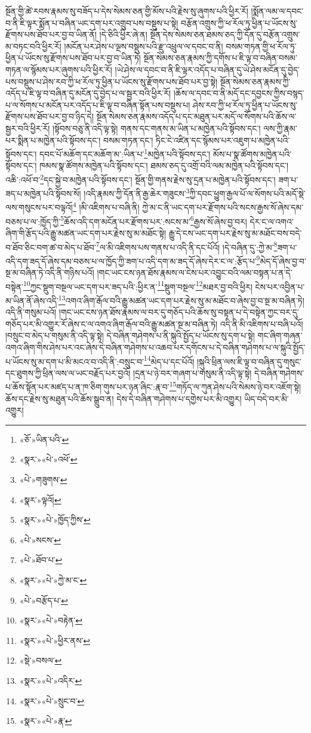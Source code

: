 སྔོན་གྱི་ཚེ་རབས་རྣམས་སུ་བཟོད་པ་དེས་སེམས་ཅན་གྱི་མོས་པའི་རྗེས་སུ་ཞུགས་པའི་ཕྱིར་རོ། །སྨོན་ལམ་ལ་དབང་བ་ནི་ཇི་ལྟར་སྨོན་པ་བཞིན་ཡང་དག་པར་འགྲུབ་པས་བསྡུས་པ་སྟེ། བརྩོན་འགྲུས་ཀྱི་ཕ་རོལ་ཏུ་ཕྱིན་པ་ཡོངས་སུ་རྫོགས་པས་ཐོབ་པར་བྱ་བ་ཡིན་ནོ། །དེ་ཅིའི་ཕྱིར་ཞེ་ན། སྔོན་དེས་སེམས་ཅན་ཐམས་ཅད་ཀྱི་དོན་དུ་བརྩོན་འགྲུས་མ་བཏང་བའི་ཕྱིར་རོ། །མངོན་པར་ཤེས་པ་ལྔས་བསྡུས་པའི་རྫུ་འཕྲུལ་ལ་དབང་བ་ནི། བསམ་གཏན་གྱི་ཕ་རོལ་ཏུ་ཕྱིན་པ་ཡོངས་སུ་རྫོགས་པས་ཐོབ་པར་བྱ་བ་ཡིན་ཏེ། སྔོན་སེམས་ཅན་རྣམས་ཀྱི་དགོས་པ་ཇི་ལྟ་བ་བཞིན་བསམ་གཏན་ལ་སྙོམས་པར་ཞུགས་པའི་ཕྱིར་རོ། །ཡེ་ཤེས་ལ་དབང་བ་ནི་ཇི་ལྟར་འདོད་པ་བཞིན་དུ་ཡེ་ཤེས་མངོན་དུ་བྱེད་པས་བསྡུས་པ་ཤེས་རབ་ཀྱི་ཕ་རོལ་ཏུ་ཕྱིན་པ་ཡོངས་སུ་རྫོགས་པས་ཐོབ་པར་བྱ་སྟེ། སྔོན་སེམས་ཅན་རྣམས་ཀྱི་འདོད་པ་ཇི་ལྟ་བ་བཞིན་དུ་མངོན་དུ་བྱེད་པ་ལ་སྦྱར་བའི་ཕྱིར་རོ། །ཆོས་ལ་དབང་བ་ནི་མདོ་དང་དབྱངས་ཀྱིས་བསྙད་པ་ལ་སོགས་པ་མངོན་པར་འདོད་པ་ཇི་ལྟ་བ་བཞིན་སྟོན་པས་བསྡུས་པ། ཤེས་རབ་ཀྱི་ཕ་རོལ་ཏུ་ཕྱིན་པ་ཡོངས་སུ་རྫོགས་པས་ཐོབ་པར་བྱ་བ་ཉིད་དེ། སྔོན་སེམས་ཅན་རྣམས་འདོད་པ་དང་མཐུན་པར་མདོ་ལ་སོགས་པའི་ཆོས་ལ་སྦྱར་བའི་ཕྱིར་རོ། །སྟོབས་བཅུ་ནི་འདི་ལྟ་སྟེ། གནས་དང་གནས་མ་ཡིན་པ་མཁྱེན་པའི་སྟོབས་དང་། ལས་ཀྱི་རྣམ་པར་སྨིན་པ་མཁྱེན་པའི་སྟོབས་དང་། བསམ་གཏན་དང་། ཏིང་ངེ་འཛིན་དང་སྙོམས་པར་འཇུག་པ་མཁྱེན་པའི་སྟོབས་དང་། དབང་པོ་མཆོག་དང་མཆོག་མ་:ཡིན་པ་\footnote{«ཅོ་»ཡིན་པའི་}མཁྱེན་པའི་སྟོབས་དང་། མོས་པ་སྣ་ཚོགས་མཁྱེན་པའི་སྟོབས་དང་། ཁམས་སྣ་ཚོགས་མཁྱེན་པའི་སྟོབས་དང་། ཐམས་ཅད་དུ་འགྲོ་བའི་ལམ་མཁྱེན་པའི་སྟོབས་དང་། འཆི་:འཕོ་བ་\footnote{«སྣར་»«པེ་»འཕོ་}དང་སྐྱེ་བ་མཁྱེན་པའི་སྟོབས་དང་། སྔོན་གྱི་གནས་རྗེས་སུ་དྲན་པ་མཁྱེན་པའི་སྟོབས་དང་། ཟག་པ་ཟད་པ་མཁྱེན་པའི་སྟོབས་སོ། །འདི་རྣམས་ཀྱི་དོན་ནི་རྒྱ་ཆེར་གཟུངས་\footnote{«པེ་»གཟུགས་}ཀྱི་དབང་ཕྱུག་རྒྱལ་པོ་ལ་སོགས་པའི་མདོ་སྡེ་ལས་གསུངས་པར་བལྟའོ།\footnote{«སྣར་»ལྟའོ།} །མི་འཇིགས་པ་བཞི་ནི། ཀྱེ་མ་ང་ནི་ཡང་དག་པར་རྫོགས་པའི་སངས་རྒྱས་སོ་ཞེས་དམ་བཅས་པ་ལ་:ཁྱོད་ཀྱི་\footnote{«སྣར་»«པེ་»ཁྱོད་ཀྱིས་}ཆོས་འདི་དག་མངོན་པར་རྫོགས་པར་:སངས་མ་\footnote{«པེ་»སངས་}རྒྱས་སོ་ཞེས་བྱ་བར། དེར་ང་ལ་འགའ་ཞིག་གི་རྩོད་པའི་རྒྱུ་མཚན་ཡང་དག་པར་རྗེས་སུ་མ་མཐོང་སྟེ། རྒྱུ་དེ་ངས་ཡང་དག་པར་རྗེས་སུ་མ་མཐོང་བས་བདེ་བ་ཐོབ་ཅིང་བག་ཚ་བ་མེད་པ་ཐོབ་\footnote{«པེ་»ཐོབ་པ་}ལ་མི་འཇིགས་པས་གནས་པ་འདི་ནི་དང་པོའོ། །དེ་བཞིན་དུ་:ཀྱེ་མ་\footnote{«སྣར་»«པེ་»ཀྱེ་མ་ང་}ཟག་པ་འདི་དག་ཟད་དོ་ཞེས་དམ་བཅས་པ་ལ་ཁྱོད་ཀྱི་ཟག་པ་འདི་དག་མ་ཟད་དོ་ཞེས་དེར་ང་ལ་:རྩོད་པ་\footnote{«པེ་»བརྩོད་པ་}མེད་དོ་ཞེས་བྱ་བ་སྔ་མ་བཞིན་ཏེ་འདི་ནི་གཉིས་པའོ། །གང་ཡང་ངས་ཉན་ཐོས་རྣམས་ལ་ངེས་པར་འབྱུང་བའི་ལམ་བསྟན་པ་ན་དེ་བསྟེན་\footnote{«སྣར་»«པེ་»བརྟེན་}ཀྱང་སྡུག་བསྔལ་ཡང་དག་པར་ཟད་པའི་:ཕྱིར་ན་\footnote{«སྣར་»«པེ་»ཕྱིར་ནས་}སྡུག་བསྔལ་\footnote{«སྡེ་»བསལ་}མཐར་བྱ་བའི་ཕྱིར། ངེས་པར་འབྱིན་པ་མ་ཡིན་ནོ་ཞེས་འདི་\footnote{«སྣར་»«པེ་»འདིར་}འགའ་ཞིག་རྒོལ་བའི་རྒྱུ་མཚན་ཡང་དག་པར་རྗེས་སུ་མ་མཐོང་བ་ཞེས་བྱ་བ་སྔ་མ་བཞིན་ཏེ། འདི་ནི་གསུམ་པའོ། །གང་ཡང་ངས་ཉན་ཐོས་རྣམས་ལ་བར་དུ་གཅོད་པའི་ཆོས་སུ་བསྟན་པ་དེ་བསྟེན་ཀྱང་བར་དུ་གཅོད་པར་མི་འགྱུར་རོ་ཞེས་ང་ལ་འགའ་ཞིག་རྒོལ་བའི་རྒྱུ་མཚན་སྔ་མ་བཞིན་ཏེ། འདི་ནི་མི་འཇིགས་པ་བཞི་པའོ། །བསྲུང་བ་མེད་པ་གསུམ་ནི་འདི་ལྟ་སྟེ། དེ་བཞིན་གཤེགས་པ་ནི་སྐུའི་སྤྱོད་པ་ཡོངས་སུ་དག་པ་སྟེ། གང་ཞིག་གཞན་འགའ་ཞིག་གིས་ཤེས་པར་འང་ཞེས་དེ་བཞིན་གཤེགས་པ་འཆབ་པར་དགོངས་པ་དེ་བཞིན་གཤེགས་པ་ལ་སྐུའི་སྤྱོད་པ་ཡོངས་སུ་མ་དག་པ་མི་མངའ་བ་འདི་ནི་:བསྲུང་བ་\footnote{«སྣར་»«པེ་»སྲུང་བ་}མེད་པ་དང་པོའོ། །སྐུའི་ཕྲིན་ལས་ཇི་ལྟ་བ་བཞིན་དུ་གསུང་དང་ཐུགས་ཀྱི་ཕྲིན་ལས་ལ་ཡང་བརྗོད་པར་བྱའོ། །དྲན་པ་ཉེ་བར་གཞག་པ་གསུམ་ནི་འདི་ལྟ་སྟེ། དེ་བཞིན་གཤེགས་པ་ཆོས་སྟོན་པར་མཛད་པ་ན་ཁ་ཅིག་གུས་པར་ཉན་ཞིང་:རྣ་བ་\footnote{«སྣར་»«པེ་»རྣ་}གཏོད་ལ་ཀུན་ཤེས་པའི་སེམས་ཉེ་བར་འཇོག་སྟེ། ཆོས་དང་རྗེས་སུ་མཐུན་པའི་ཆོས་སྒྲུབ་ན། དེས་དེ་བཞིན་གཤེགས་པ་དགྱེས་པར་མི་འགྱུར། ཡིད་བདེ་བར་མི་འགྱུར། 